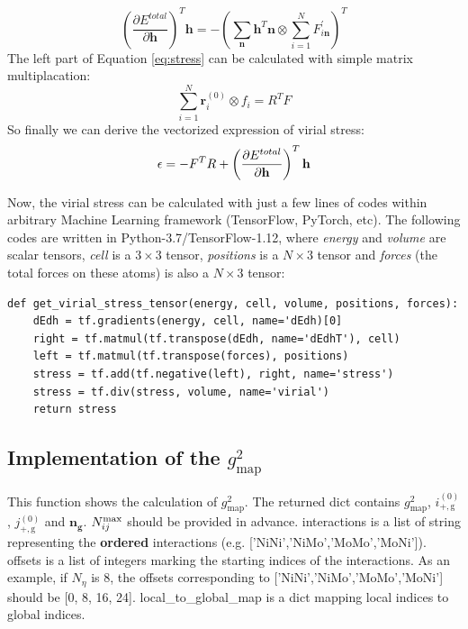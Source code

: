 \documentclass[preprint]{revtex4-2}
\begin{document}
{\begin{equation}
\left(\frac{\partial E^{total}}{\partial \mathbf{h}}\right)^T \mathbf{h} =
-\left(\sum_{\mathbf{n}}{\mathbf{h}^T\mathbf{n}} \otimes 
\sum_{i=1}^{N}{F^{\prime}_{i\mathbf{n}}}\right)^T
\end{equation}
The left part of Equation \ref{eq:stress} can be calculated with 
simple matrix multiplacation:
\begin{equation}
\sum_{i=1}^{N}{\mathbf{r}_i^{(0)} \otimes f_i} = R^{T} F
\end{equation}
So finally we can derive the vectorized expression of virial stress:
\begin{equation}
\epsilon = -F^{T} R + \left( \frac{\partial{E^{total}}}{\partial \mathbf{h}} \right)^T\mathbf{h}
\end{equation}

Now, the virial stress can be calculated with just a few lines of codes within 
arbitrary Machine Learning framework (TensorFlow, PyTorch, etc). The following 
codes are written in Python-3.7/TensorFlow-1.12, where \textit{energy} and 
\textit{volume} are scalar tensors, \textit{cell} is a $3 \times 3$ tensor, 
\textit{positions} is a $N\times 3$ tensor and \textit{forces} (the total forces 
on these atoms) is also a $N\times 3$ tensor:
\begin{verbatim}
def get_virial_stress_tensor(energy, cell, volume, positions, forces):
    dEdh = tf.gradients(energy, cell, name='dEdh)[0]
    right = tf.matmul(tf.transpose(dEdh, name='dEdhT'), cell)
    left = tf.matmul(tf.transpose(forces), positions)
    stress = tf.add(tf.negative(left), right, name='stress')
    stress = tf.div(stress, volume, name='virial')
    return stress
\end{verbatim}

\newpage

\subsection{Implementation of the $g^2_{\mathrm{map}}$}

This function shows the calculation of $g^2_{\mathrm{map}}$. The returned dict
contains $g^2_{\mathrm{map}}$, $i^{(0)}_{\mathrm{+,g}}$, 
$j^{(0)}_{\mathrm{+,g}}$ and $\mathbf{n_g}$. $N_{ij}^{\mathrm{max}}$ should be provided in 
advance. \textmd{interactions} is a list of \textmd{string} representing the 
\textbf{ordered} interactions (e.g. \textmd{['NiNi','NiMo','MoMo','MoNi']}). 
\textmd{offsets} is a list of integers marking the starting indices of the 
\textmd{interactions}. As an example, if $N_{\eta}$ is 8, the \textmd{offsets}
corresponding to \textmd{['NiNi','NiMo','MoMo','MoNi']} should be 
\textmd{[0, 8, 16, 24]}.
\textmd{local\_to\_global\_map} is a dict mapping local indices to global 
indices.

}
\end{document}
